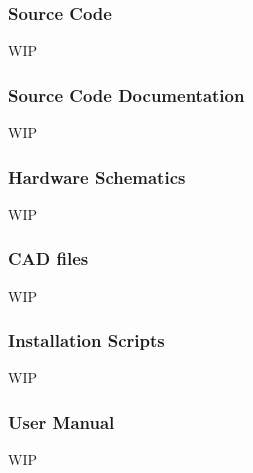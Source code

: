 \subsubsection{Source Code}
WIP

\subsubsection{Source Code Documentation}
WIP

\subsubsection{Hardware Schematics}
WIP

\subsubsection{CAD files}
WIP

\subsubsection{Installation Scripts}
WIP

\subsubsection{User Manual}
WIP